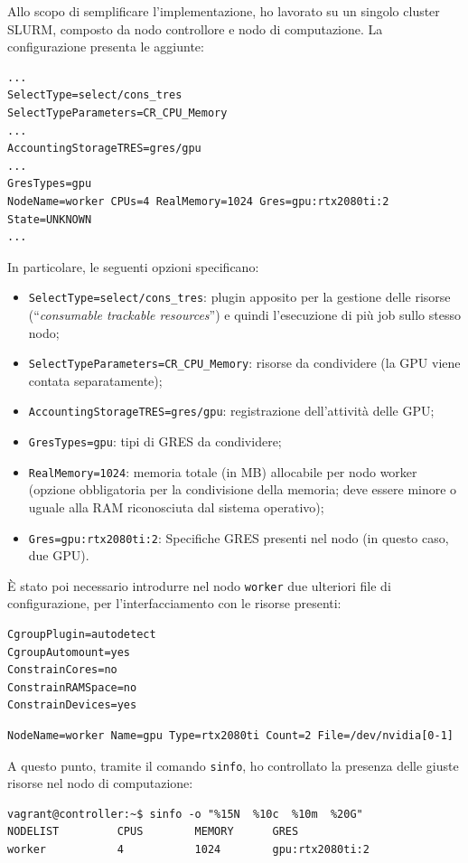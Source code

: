 \documentclass[12pt,a4paper,twoside,openright]{book}
\begin{document}
Allo scopo di semplificare l'implementazione, ho lavorato su un singolo cluster \ac{SLURM}, composto da nodo controllore e nodo di computazione. La configurazione presenta le aggiunte:
\begin{verbatim}
...
SelectType=select/cons_tres
SelectTypeParameters=CR_CPU_Memory
...
AccountingStorageTRES=gres/gpu
...
GresTypes=gpu
NodeName=worker CPUs=4 RealMemory=1024 Gres=gpu:rtx2080ti:2 State=UNKNOWN
...
\end{verbatim}
In particolare, le seguenti opzioni specificano:
\begin{itemize}
    \item \texttt{SelectType=select/cons_tres}: plugin apposito per la gestione delle risorse (``\textit{consumable trackable resources}'') e quindi l'esecuzione di più job sullo stesso nodo;
    \item \texttt{SelectTypeParameters=CR_CPU_Memory}: risorse da condividere (la \ac{GPU} viene contata separatamente);
    \item \texttt{AccountingStorageTRES=gres/gpu}: registrazione dell'attività delle \ac{GPU};
    \item \texttt{GresTypes=gpu}: tipi di \ac{GRES} da condividere;
    \item \texttt{RealMemory=1024}: memoria totale (in \ac{MB}) allocabile per nodo worker (opzione obbligatoria per la condivisione della memoria; deve essere minore o uguale alla \ac{RAM} riconosciuta dal sistema operativo);
    \item \texttt{Gres=gpu:rtx2080ti:2}: Specifiche \ac{GRES} presenti nel nodo (in questo caso, due \ac{GPU}).
\end{itemize}
È stato poi necessario introdurre nel nodo \texttt{worker} due ulteriori file di configurazione, per l'interfacciamento con le risorse presenti:
\begin{verbatim}
CgroupPlugin=autodetect
CgroupAutomount=yes
ConstrainCores=no
ConstrainRAMSpace=no
ConstrainDevices=yes
\end{verbatim}
\begin{verbatim}
NodeName=worker Name=gpu Type=rtx2080ti Count=2 File=/dev/nvidia[0-1]
\end{verbatim}
A questo punto, tramite il comando \texttt{sinfo}, ho controllato la presenza delle giuste risorse nel nodo di computazione:
\begin{verbatim}
vagrant@controller:~$ sinfo -o "%15N  %10c  %10m  %20G"
NODELIST         CPUS        MEMORY      GRES
worker           4           1024        gpu:rtx2080ti:2
\end{verbatim}
\end{document}
